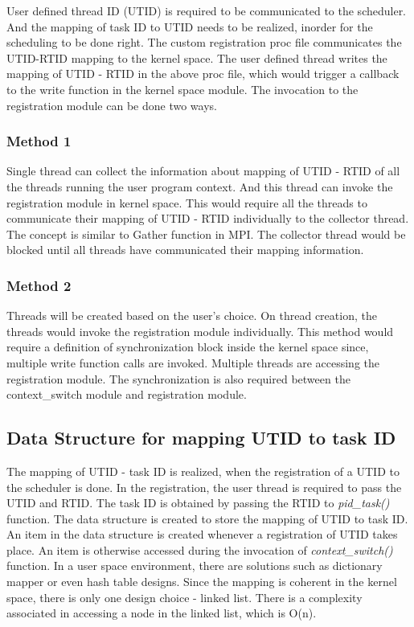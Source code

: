User defined thread ID (UTID) is required to be communicated to the scheduler. 
And the mapping of task ID to UTID needs to be realized, inorder for the scheduling to be done right. 
The custom registration proc file communicates the UTID-RTID mapping to the kernel space. 
The user defined thread writes the mapping of UTID - RTID in the above proc file, which would trigger a callback to the write function in the kernel space module. 
The invocation to the registration module can be done two ways.

\subsubsection{Method 1}

Single thread can collect the information about mapping of UTID - RTID of all the threads running the user program context. 
And this thread can invoke the registration module in kernel space. 
This would require all the threads to communicate their mapping of UTID - RTID individually to the collector thread. 
The concept is similar to Gather function in MPI. 
The collector thread would be blocked until all threads have communicated their mapping information. 

\subsubsection{Method 2}

Threads will be created based on the user's choice. 
On thread creation, the threads would invoke the registration module individually. 
This method would require a definition of synchronization block inside the kernel space since, multiple write function calls are invoked. 
Multiple threads are accessing the registration module. 
The synchronization is also required between the context\_switch module and registration module.


\subsection{Data Structure for mapping UTID to task ID}

The mapping of UTID - task ID is realized, when the registration of a UTID to the scheduler is done. 
In the registration, the user thread is required to pass the UTID and RTID. 
The task ID is obtained by passing the RTID to \emph{pid\_task()} function. 
The data structure is created to store the mapping of UTID to task ID. 
An item in the data structure is created whenever a registration of UTID takes place. 
An item is otherwise accessed during the invocation of \emph{context\_switch()} function. 
In a user space environment, there are solutions such as dictionary mapper or even hash table designs. 
Since the mapping is coherent in the kernel space, there is only one design choice - linked list. 
There is a complexity associated in accessing a node in the linked list, which is O(n).

